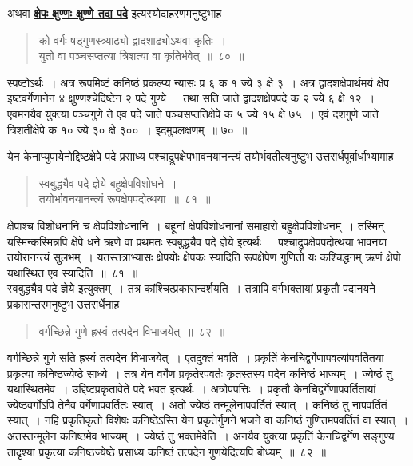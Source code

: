 \documentclass[11pt, openany]{book}
\begin{document}
\vspace{-2mm}
 अथवा \hyperref[72]{\textbf{क्षेपः क्षुण्णः क्षुण्णे तदा पदे}} इत्यस्योदाहरणमनुष्टुभाह\textendash
\begin{quote}
    \eg 
     को वर्गः षड्गुणस्त्र्याढ्यो द्वादशाढ्योऽथवा कृतिः~। \\
 युतो वा पञ्चसप्तत्या त्रिशत्या वा कृतिर्भवेत्~॥~८०~॥~
\end{quote}

स्पष्टोऽर्थः~। अत्र रूपमिष्टं कनिष्ठं प्रकल्प्य न्यासः प्र ६ क १ ज्ये
३ क्षे ३~। 
अत्र द्वादशक्षेपार्थमयं क्षेप इष्टवर्गेणानेन ४ क्षुण्णश्चेदिष्टेन २ पदे
गुण्ये~। तथा 
सति जाते द्वादशक्षेपपदे क २ ज्ये ६ क्षे १२~। एवमनयैव युक्त्या पञ्चगुणे
ते 
एव पदे जाते पञ्चसप्ततिक्षेपे क ५ ज्ये १५ क्षे ७५~। एवं दशगुणे जाते 
त्रिशतीक्षेपे क १० ज्ये ३० क्षे ३००~। इदमुपलक्षणम्~॥ ७०~॥
\newpage

 येन केनाप्युपायेनोद्दिष्टक्षेपे पदे प्रसाध्य
पश्चाद्रूपक्षेपभावनयानन्त्यं तयोर्भवतीत्यनुष्टुभ उत्तरार्धपूर्वार्धाभ्यामाह\textendash  
\begin{quote}
    \ab
     स्वबुद्ध्यैव पदे ज्ञेये बहुक्षेपविशोधने~। \\
 तयोर्भावनयानन्त्यं रूपक्षेपपदोत्थया~॥~८१~॥~
\end{quote}

 क्षेपाश्च विशोधनानि च क्षेपविशोधनानि~। बहूनां क्षेपविशोधनानां समाहारो
बहुक्षेपविशोधनम्~। तस्मिन्~। यस्मिन्कस्मिन्नपि क्षेपे धने ऋणे वा
प्रथमतः स्वबुद्ध्यैव पदे ज्ञेये इत्यर्थः~। पश्चाद्रूपक्षेपपदोत्थया भावनया
तयोरानन्त्यं सुलभम्~। 
यतस्तत्राभ्यासः क्षेपयोः क्षेपकः स्यादिति रूपक्षेपेण गुणितो यः
कश्चिद्धनम् ऋणं क्षेपो यथास्थित एव स्यादिति~॥~८१~॥~\\

\vspace{-2mm}
 स्वबुद्ध्यैव पदे ज्ञेये इत्युक्तम्~। तत्र कांश्चित्प्रकारान्दर्शयति~।
तत्रापि 
वर्गभक्तायां प्रकृतौ पदानयने प्रकारान्तरमनुष्टुभ उत्तरार्धेनाह\textendash
\begin{quote}
    \ab 
     वर्गच्छिन्ने गुणे ह्रस्वं तत्पदेन विभाजयेत्~॥~८२~॥~
\end{quote}

 वर्गच्छिन्ने गुणे सति ह्रस्वं तत्पदेन विभाजयेत्~। एतदुक्तं भवति~।
प्रकृतिं 
केनचिद्वर्गेणापवर्त्यापवर्तितया प्रकृत्या कनिष्ठज्येष्ठे साध्ये~। तत्र
येन वर्गेण प्रकृतेरपवर्तः कृतस्तस्य पदेन कनिष्ठं भाज्यम्~। ज्येष्ठं तु यथास्थितमेव~।
उद्दिष्टप्रकृतावेते पदे भवत इत्यर्थः~। अत्रोपपत्तिः~। प्रकृतौ केनचिद्वर्गेणापवर्तितायां
ज्येष्ठवर्गोऽपि तेनैव वर्गेणापवर्तितः स्यात्~। अतो ज्येष्ठं तन्मूलेनापवर्तितं स्यात्~।
कनिष्ठं तु नापवर्तितं स्यात्~। नहि प्रकृतिकृतो विशेषः कनिष्ठेऽस्ति येन
प्रकृतेर्गुणने भजने 
वा कनिष्ठं गुणितमपवर्तितं वा स्यात्~। अतस्तन्मूलेन कनिष्ठमेव भाज्यम्~। ज्येष्ठं तु भक्तमेवेति~। अनयैव युक्त्या प्रकृतिं केनचिद्वर्गेण सङ्गुण्य
तादृश्या प्रकृत्या 
कनिष्ठज्येष्ठे प्रसाध्य कनिष्ठं तत्पदेन गुणयेदित्यपि बोध्यम्~॥~८२~॥~\\
\end{document}
